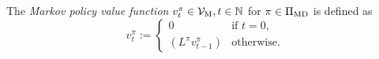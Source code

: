 \begin{definition} \label{def:v-dp-pi}
  The \emph{Markov policy value function} $v^{\pi}_t\in \mathcal{V}_{\mathrm{M}}, t \in \mathbb{N}$  for $\pi\in \Pi_{\mathrm{MD}}$ is defined as
  \[
    v^{\pi}_t :=
    \begin{cases}
      0 &\text{if } t = 0, \\
      (L^{\pi}  v^{\pi}_{t-1}) &\text{otherwise}.
    \end{cases}
  \]
\end{definition}

